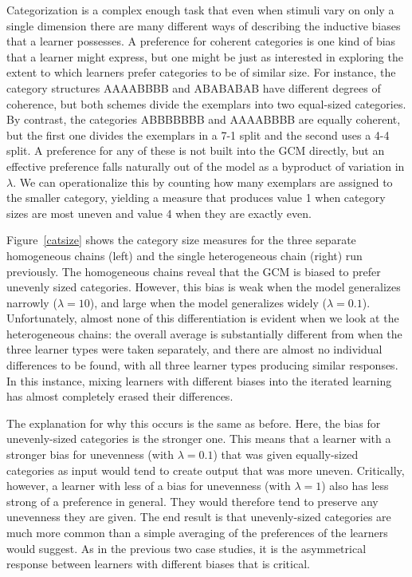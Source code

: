 \documentclass[doc]{apa6}
\begin{document}
Categorization is a complex enough task that even when stimuli vary on only a single dimension there are many different ways of describing the inductive biases that a learner possesses. A preference for coherent categories is one kind of bias that a learner might express, but one might be just as interested in exploring the extent to which learners prefer categories to be of similar size. For instance, the category structures AAAABBBB and ABABABAB have different degrees of coherence, but both schemes divide the exemplars into two equal-sized categories. By contrast, the categories ABBBBBBB and AAAABBBB are equally coherent, but the first one divides the exemplars in a 7-1 split and the second uses a 4-4 split. A preference for any of these is not built into the GCM directly, but an effective preference falls naturally out of the model as a byproduct of variation in $\lambda$. We can operationalize this by counting how many exemplars are assigned to the smaller category, yielding a measure that produces value 1 when category sizes are most uneven and value 4 when they are exactly even. 

Figure~\ref{catsize} shows the category size measures for the three separate homogeneous chains (left) and the single heterogeneous chain (right) run previously. The homogeneous chains reveal that the GCM is biased to prefer unevenly sized categories. However, this bias is weak when the model generalizes narrowly ($\lambda=10$), and large when the model generalizes widely ($\lambda=0.1$). Unfortunately, almost none of this differentiation is evident when we look at the heterogeneous chains: the overall average is substantially different from when the three learner types were taken separately, and there are almost no individual differences to be found, with all three learner types producing similar responses. In this instance, mixing learners with different biases into the iterated learning has almost completely erased their differences. 

The explanation for why this occurs is the same as before. Here, the bias for unevenly-sized categories is the stronger one. This means that a learner with a stronger bias for unevenness (with $\lambda=0.1$) that was given equally-sized categories as input would tend to create output that was more uneven. Critically, however, a learner with less of a bias for unevenness (with $\lambda=1$) also has less strong of a preference in general. They would therefore tend to preserve any unevenness they are given. The end result is that unevenly-sized categories are much more common than a simple averaging of the preferences of the learners would suggest. As in the previous two case studies, it is the asymmetrical response between learners with different biases that is critical.
\end{document}
